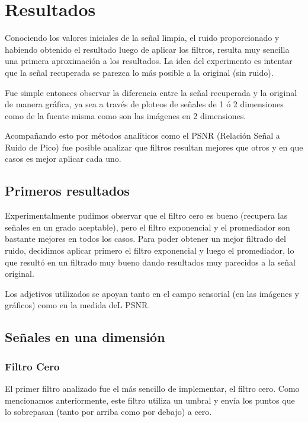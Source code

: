 \section{Resultados}

Conociendo los valores iniciales de la se\~nal limpia, el ruido proporcionado y
habiendo obtenido el resultado luego de aplicar los filtros, resulta muy
sencilla una primera aproximaci\'on a los resultados. La idea del experimento es
intentar que la se\~nal recuperada se parezca lo m\'as posible a la original
(sin ruido).

Fue simple entonces observar la diferencia entre la se\~nal recuperada y
la original de manera gr\'afica, ya sea a trav\'es de ploteos de se\~nales de 1
\'o 2 dimensiones como de la fuente misma como son las im\'agenes en 2
dimensiones.

Acompa\~nando esto por m\'etodos anal\'iticos como el PSNR (Relaci\'on Se\~nal a
Ruido de Pico) fue posible analizar que filtros resultan mejores que otros y en
que casos es mejor aplicar cada uno.

\subsection{Primeros resultados}

Experimentalmente pudimos observar que el filtro cero es bueno (recupera las
se\~nales en un grado aceptable), pero el filtro 
exponencial y el promediador son bastante mejores en todos los casos. 
Para poder obtener un mejor filtrado del ruido, decidimos aplicar primero el 
filtro exponencial y luego el promediador, lo que result\'o en un filtrado muy 
bueno dando resultados muy parecidos a la se\~nal original. 

Los adjetivos utilizados se apoyan tanto en el campo sensorial (en las
im\'agenes y gr\'aficos) como en la medida deL PSNR. 

\subsection{Se\~nales en una dimensi\'on}

\subsubsection{Filtro Cero}

El primer filtro analizado fue el m\'as sencillo de implementar, el filtro cero.
Como mencionamos anteriormente, este filtro utiliza un umbral y env\'ia los
puntos que lo sobrepasan (tanto por arriba como por debajo) a cero.

